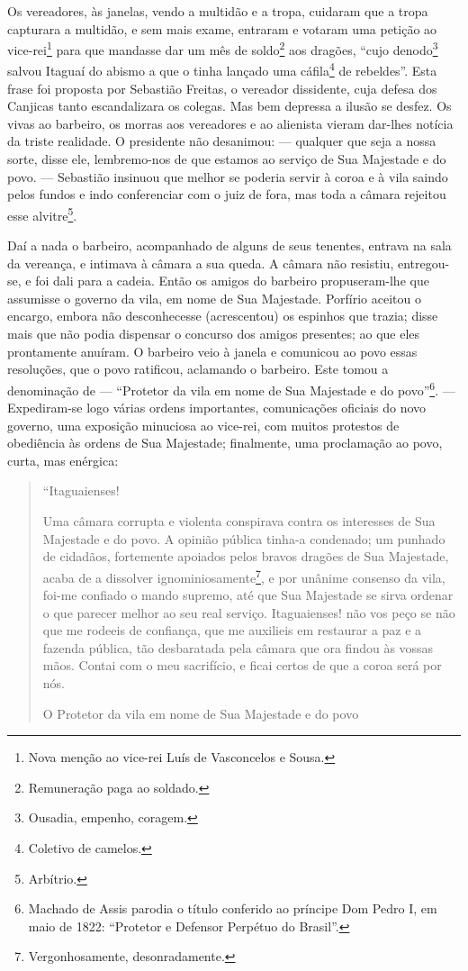 Os vereadores, às janelas, vendo a multidão e a tropa, cuidaram que a
tropa capturara a multidão, e sem mais exame, entraram e votaram uma
petição ao vice-rei\footnote{Nova menção ao vice-rei Luís de Vasconcelos
  e Sousa.} para que mandasse dar um mês de soldo\footnote{Remuneração
  paga ao soldado.} aos dragões, ``cujo denodo\footnote{Ousadia,
  empenho, coragem.} salvou Itaguaí do abismo a que o tinha lançado uma
cáfila\footnote{Coletivo de camelos.} de rebeldes''. Esta frase foi
proposta por Sebastião Freitas, o vereador dissidente, cuja defesa dos
Canjicas tanto escandalizara os colegas. Mas bem depressa a ilusão se
desfez. Os vivas ao barbeiro, os morras aos vereadores e ao alienista
vieram dar-lhes notícia da triste realidade. O presidente não desanimou:
--- qualquer que seja a nossa sorte, disse ele, lembremo-nos de que
estamos ao serviço de Sua Majestade e do povo. --- Sebastião insinuou
que melhor se poderia servir à coroa e à vila saindo pelos fundos e indo
conferenciar com o juiz de fora, mas toda a câmara rejeitou esse
alvitre\footnote{Arbítrio.}.

Daí a nada o barbeiro, acompanhado de alguns de seus tenentes, entrava
na sala da vereança, e intimava à câmara a sua queda. A câmara não
resistiu, entregou-se, e foi dali para a cadeia. Então os amigos do
barbeiro propuseram-lhe que assumisse o governo da vila, em nome de Sua
Majestade. Porfírio aceitou o encargo, embora não desconhecesse
(acrescentou) os espinhos que trazia; disse mais que não podia dispensar
o concurso dos amigos presentes; ao que eles prontamente anuíram. O
barbeiro veio à janela e comunicou ao povo essas resoluções, que o povo
ratificou, aclamando o barbeiro. Este tomou a denominação de ---
``Protetor da vila em nome de Sua Majestade e do povo''\footnote{Machado
  de Assis parodia o título conferido ao príncipe Dom Pedro I, em maio
  de 1822: ``Protetor e Defensor Perpétuo do Brasil''.}. ---
Expediram-se logo várias ordens importantes, comunicações oficiais do
novo governo, uma exposição minuciosa ao vice-rei, com muitos protestos
de obediência às ordens de Sua Majestade; finalmente, uma proclamação ao
povo, curta, mas enérgica:

\begin{quote}
``Itaguaienses!

Uma câmara corrupta e violenta conspirava contra os interesses de Sua
Majestade e do povo. A opinião pública tinha-a condenado; um punhado de
cidadãos, fortemente apoiados pelos bravos dragões de Sua Majestade,
acaba de a dissolver ignominiosamente\footnote{Vergonhosamente,
  desonradamente.}, e por unânime consenso da vila, foi-me confiado o
mando supremo, até que Sua Majestade se sirva ordenar o que parecer
melhor ao seu real serviço. Itaguaienses! não vos peço se não que me
rodeeis de confiança, que me auxilieis em restaurar a paz e a fazenda
pública, tão desbaratada pela câmara que ora findou às vossas mãos.
Contai com o meu sacrifício, e ficai certos de que a coroa será por nós.

O Protetor da vila em nome de Sua Majestade e do povo
\end{quote}


